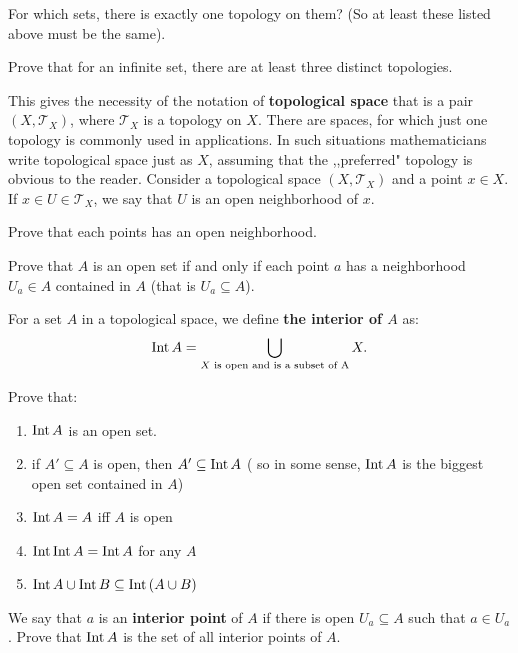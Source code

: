 \begin{prob}
	For which sets, there is exactly one topology on them? (So at least
  these listed above must be the same).
\end{prob}

\begin{prob}
	Prove that for an infinite set, there are at least three distinct
  topologies.
\end{prob}

\noindent This gives the necessity of the notation of \textbf{topological space} that is a pair $(X,\mathcal T_X)$, where $\mathcal T_X$ is a topology on
$X$. There are spaces, for which just one topology is commonly used in applications. In such situations mathematicians write topological space just as
$X$, assuming that the ,,preferred" topology is obvious to the reader.
Consider a topological space $(X,\mathcal T_X)$ and a point $x\in X$.
If $x\in U\in \mathcal T_X$, we say that $U$ is an open neighborhood
of $x$.

\begin{prob}
  Prove that each points has an open neighborhood.
\end{prob}

\begin{prob}
  Prove that $A$ is an open set if and only if each point $a$ has
  a neighborhood $U_a\in A$ contained in $A$
  (that is $U_a\subseteq A$).
\end{prob}

\noindent For a set $A$ in a topological space, we define \textbf{the
interior of $A$} as:
$$\text{Int\,} A=\bigcup_{X \text{ is open and is a subset of A}} X.$$

\begin{prob}
  Prove that:
  \begin{enumerate}
    \item $\text{Int\,} A$ is an open set.
    \item if $A'\subseteq A$ is open, then $A'\subseteq \text{Int\,} A$ (
    so in some sense, $\text{Int\,} A$ is the biggest open set contained in
    $A$)
    \item $\text{Int\,} A = A$ iff $A$ is open
    \item $\text{Int\,} \text{Int\,} A = \text{Int\,} A$ for any $A$
    \item $\text{Int\,} A\cup \text{Int\,} B \subseteq \text{Int\,} (A\cup B)$
  \end{enumerate}
\end{prob}

\begin{prob}
	We say that $a$ is an \textbf{interior point} of $A$ if there is open $U_a\subseteq A$ such that $a\in U_a$. Prove that $\text{Int\,} A$ is the set
	of all interior points of $A$.
\end{prob}

